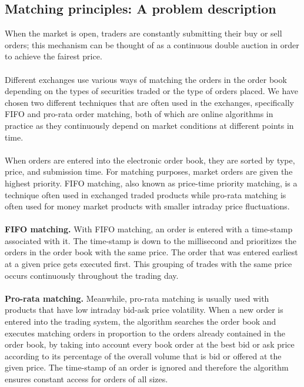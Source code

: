 \documentclass{article}
\begin{document}
\subsection{Matching principles: A problem description}
When the market is open, traders are constantly submitting their buy or sell orders; this mechanism can be thought of as a continuous double auction in order to achieve the fairest price.\\\\
Different exchanges use various ways of matching the orders in the order book depending on the types of securities traded or the type of orders placed. We have chosen two different techniques that are often used in the exchanges, specifically FIFO and pro-rata order matching, both of which are online algorithms in practice as they continuously depend on market conditions at different points in time.\\\\
When orders are entered into the electronic order book, they are sorted by type, price, and submission time. For matching purposes, market orders are given the highest priority. FIFO matching, also known as price-time priority matching, is a technique often used in exchanged traded products while pro-rata matching is often used for money market products with smaller intraday price fluctuations.\\\\
\textbf{FIFO matching. } With FIFO matching, an order is entered with a time-stamp associated with it. The time-stamp is down to the millisecond and prioritizes the orders in the order book with the same price. The order that was entered earliest at a given price gets executed first. This grouping of trades with the same price occurs continuously throughout the trading day.\\\\
\textbf{Pro-rata matching. } Meanwhile, pro-rata matching is usually used with products that have low intraday bid-ask price volatility. When a new order is entered into the trading system, the algorithm searches the order book and executes matching orders in proportion to the orders already contained in the order book, by taking into account every book order at the best bid or ask price according to its percentage of the overall volume that is bid or offered at the given price. The time-stamp of an order is ignored and therefore the algorithm ensures constant access for orders of all sizes.\\\\
\end{document}

